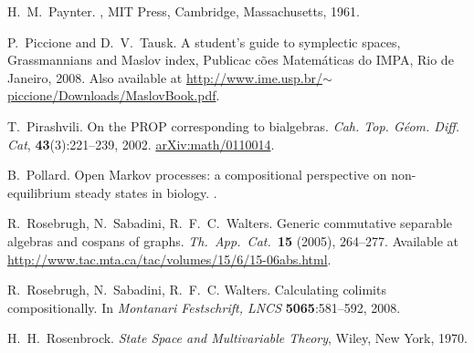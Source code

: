 \begin{thebibliography}{RSW00}

    H.\ M.\ Paynter.
    , MIT Press, Cambridge, Massachusetts, 1961.


    P.\ Piccione and D.\ V.\ Tausk.
    \newblock A student's guide to symplectic
    spaces, Grassmannians and Maslov index, Publicac c\~oes Matem\'aticas do
    IMPA, Rio de Janeiro, 2008.
    \newblock Also available at
    \href{http://www.ime.usp.br/~piccione/Downloads/MaslovBook.pdf}
    {http://www.ime.usp.br/$\sim$piccione/Downloads/MaslovBook.pdf}.

    T.\ Pirashvili.
    \newblock On the PROP corresponding to bialgebras.
    \newblock 
    \emph{Cah. Top. G\'{e}om. Diff. Cat}, {\bf 43}(3):221--239, 2002.
    \newblock 
    \href{http://arxiv.org/abs/math/0110014}{arXiv:math/0110014}.

    B.\ Pollard.
    \newblock Open Markov processes: a compositional
    perspective on non-equilibrium steady states in biology.
    .

    R.\ Rosebrugh, N.\ Sabadini, R.\ F.\ C.\ Walters.
    \newblock Generic
    commutative separable algebras and cospans of graphs.
    \newblock \textsl{Th.\ App.\
    Cat.\ }\textbf{15} (2005), 264--277.
    \newblock Available at
    \href{http://www.tac.mta.ca/tac/volumes/15/6/15-06abs.html}{http://www.tac.mta.ca/tac/volumes/15/6/15-06abs.html}.

    R.\ Rosebrugh, N.\ Sabadini, R.\ F.\ C. Walters.
    \newblock Calculating
    colimits compositionally.
    \newblock In \emph{Montanari Festschrift, LNCS} {\bf 5065}:581--592, 2008.

    H.\ H.\ Rosenbrock.
    \newblock \emph{State Space and Multivariable Theory},
    Wiley, New York, 1970. 



\end{thebibliography}
